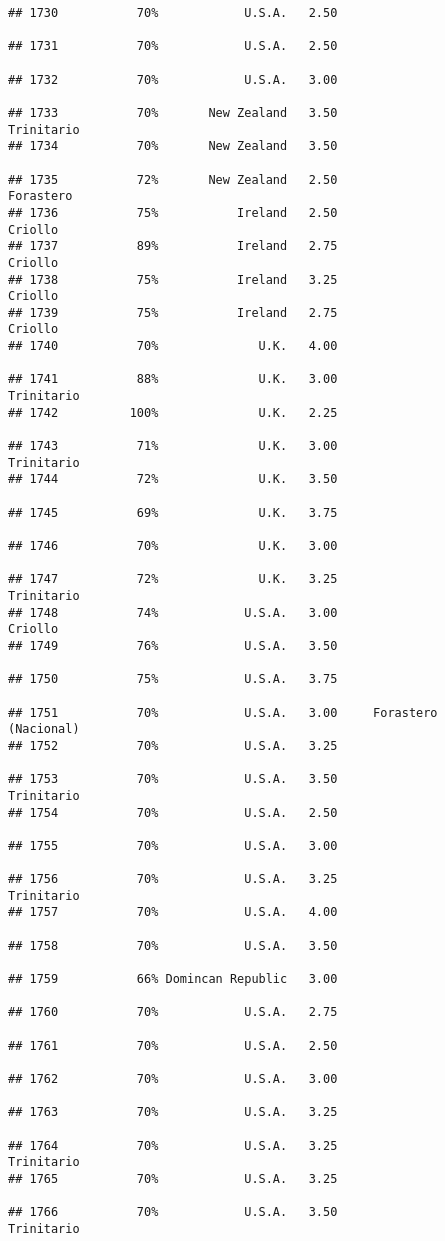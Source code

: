 \documentclass[
]{article}
\begin{document}
\begin{verbatim}
## 1730           70%            U.S.A.   2.50                         
## 1731           70%            U.S.A.   2.50                         
## 1732           70%            U.S.A.   3.00                         
## 1733           70%       New Zealand   3.50               Trinitario
## 1734           70%       New Zealand   3.50                         
## 1735           72%       New Zealand   2.50                Forastero
## 1736           75%           Ireland   2.50                  Criollo
## 1737           89%           Ireland   2.75                  Criollo
## 1738           75%           Ireland   3.25                  Criollo
## 1739           75%           Ireland   2.75                  Criollo
## 1740           70%              U.K.   4.00                         
## 1741           88%              U.K.   3.00               Trinitario
## 1742          100%              U.K.   2.25                         
## 1743           71%              U.K.   3.00               Trinitario
## 1744           72%              U.K.   3.50                         
## 1745           69%              U.K.   3.75                         
## 1746           70%              U.K.   3.00                         
## 1747           72%              U.K.   3.25               Trinitario
## 1748           74%            U.S.A.   3.00                  Criollo
## 1749           76%            U.S.A.   3.50                         
## 1750           75%            U.S.A.   3.75                         
## 1751           70%            U.S.A.   3.00     Forastero (Nacional)
## 1752           70%            U.S.A.   3.25                         
## 1753           70%            U.S.A.   3.50               Trinitario
## 1754           70%            U.S.A.   2.50                         
## 1755           70%            U.S.A.   3.00                         
## 1756           70%            U.S.A.   3.25               Trinitario
## 1757           70%            U.S.A.   4.00                         
## 1758           70%            U.S.A.   3.50                         
## 1759           66% Domincan Republic   3.00                         
## 1760           70%            U.S.A.   2.75                         
## 1761           70%            U.S.A.   2.50                         
## 1762           70%            U.S.A.   3.00                         
## 1763           70%            U.S.A.   3.25                         
## 1764           70%            U.S.A.   3.25               Trinitario
## 1765           70%            U.S.A.   3.25                         
## 1766           70%            U.S.A.   3.50               Trinitario

\end{verbatim}
\end{document}
